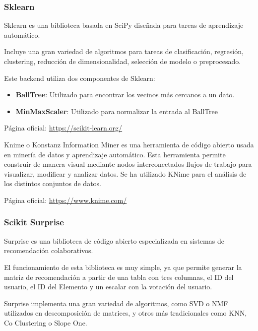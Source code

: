\hypertarget{sklearn}{%
\subsubsection{Sklearn}\label{sklearn}}

Sklearn \cite{scikit-learn} es una biblioteca basada en SciPy \cite{2020SciPy-NMeth} diseñada para tareas de
aprendizaje automático.

Incluye una gran variedad de algoritmos para tareas de clasificación,
regresión, clustering, reducción de dimensionalidad, selección de modelo
o preprocesado.

Este backend utiliza dos componentes de Sklearn:

\begin{itemize}
\itemsep0em 
\item
  \textbf{BallTree}: Utilizado para encontrar los vecinos más cercanos a
  un dato.
\item
  \textbf{MinMaxScaler}: Utilizado para normalizar la entrada al
  BallTree
\end{itemize}

Página oficial: \href{https://scikit-learn.org/}{https://scikit-learn.org/}

\label{knime}
Knime o Konstanz Information Miner es una herramienta de código abierto usada en minería de datos y aprendizaje automático. Esta herramienta permite construir de manera visual mediante nodos interconectados flujos de trabajo para visualizar, modificar y analizar datos.
Se ha utilizado KNime para el análisis de los distintos conjuntos de datos. 

Página oficial: \href{https://www.knime.com/}{https://www.knime.com/}

\hypertarget{scikit-surprise}{%
\subsubsection{Scikit Surprise}\label{scikit-surprise}}

Surprise \cite{supriselib} es una biblioteca de código abierto especializada en sistemas
de recomendación colaborativos.

El funcionamiento de esta biblioteca es muy simple, ya que permite
generar la matriz de recomendación a partir de una tabla con tres columnas, el ID del usuario, el ID del Elemento y un escalar con la votación del usuario. 

Surprise implementa una gran variedad de algoritmos, como SVD o NMF
utilizados en descomposición de matrices, y otros más tradicionales como
KNN, Co Clustering o Slope One.

